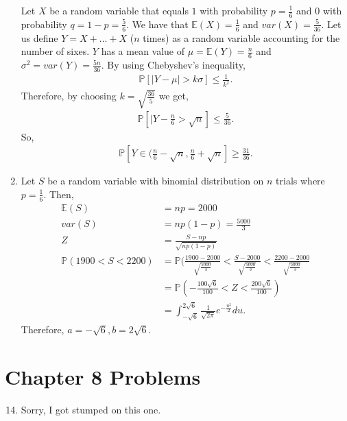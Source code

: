 \documentclass{article}
\begin{document}
\begin{enumerate}
    Let $X$ be a random variable that equals $1$ with probability $p=\frac{1}{6}$ and $0$ with probability $q=1-p=\frac{5}{6}.$ We have that $\mathbb{E}(X)=\frac{1}{6}$ and $var(X)=\frac{5}{36}.$ Let us define $Y=X+...+X$ ($n$ times) as a random variable accounting for the number of sixes. $Y$ has a mean value of $\mu=\mathbb{E}(Y)=\frac{n}{6}$ and $\sigma^2=var(Y)=\frac{5n}{36}$. By using Chebyshev's inequality,
    \begin{align*}
        \mathbb{P}[|Y-\mu|>k\sigma]\leq \frac{1}{k^2}.
    \end{align*} Therefore, by choosing $k=\sqrt{\frac{36}{5}}$ we get,
    \begin{align*}
        \mathbb{P}[|Y-\frac{n}{6}>\sqrt{n}]\leq \frac{5}{36}.
    \end{align*} So,
    \begin{align*}
        \mathbb{P}[Y\in(\frac{n}{6}-\sqrt{n},\frac{n}{6}+\sqrt{n}]\geq\frac{31}{36}.
    \end{align*}
    
    \setcounter{enumi}{31}
    \item
    
    Let $S$ be a random variable with binomial distribution on $n$ trials where $p=\frac{1}{6}$. Then,
    \begin{align*}
        \mathbb{E}(S)&=np=2000\\
        var(S)&=np(1-p)=\frac{5000}{3}\\
        Z&=\frac{S-np}{\sqrt{np(1-p)}}\\
        \mathbb{P}(1900<S<2200) &= \mathbb{P}(\frac{1900-2000}{\sqrt{\frac{5000}{3}}}<\frac{S-2000}{\sqrt{\frac{5000}{3}}}<\frac{2200-2000}{\sqrt{\frac{5000}{3}}}\\
        &=\mathbb{P}(-\frac{100\sqrt{6}}{100}<Z<\frac{200\sqrt{6}}{100})\\
        &=\int_{-\sqrt{6}}^{2\sqrt{6}}\frac{1}{\sqrt{2\pi}}e^{-\frac{u^2}{2}}du.
    \end{align*} Therefore, $a=-\sqrt{6}, b=2\sqrt{6}$.
    
\end{enumerate}

\section{Chapter 8 Problems}

\begin{enumerate}
    \setcounter{enumi}{13}
    \item 
    
    Sorry, I got stumped on this one.
    
\end{enumerate}
\end{document}
